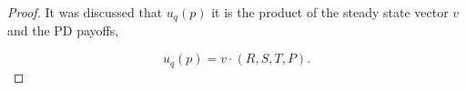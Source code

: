 \begin{proof}

It was discussed that \(u_q(p)\) it is the product of the steady state
vector \(v\) and the PD payoffs,

\[u_q(p) = v \cdot (R, S, T, P).\]



\end{proof}
